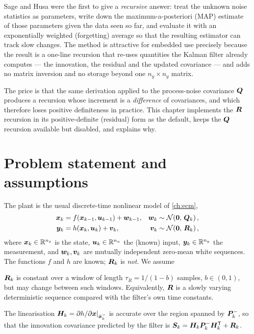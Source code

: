Sage and Husa \cite{sagehusa1969} were the first to give a \emph{recursive} answer: treat the
unknown noise statistics as parameters, write down the maximum-a-posteriori (MAP) estimate of those
parameters given the data seen so far, and evaluate it with an exponentially weighted (forgetting)
average so that the resulting estimator can track slow changes.  The method is attractive for
embedded use precisely because the result is a one-line recursion that re-uses quantities the
Kalman filter already computes --- the innovation, the residual and the updated covariance --- and
adds no matrix inversion and no storage beyond one $n_y\times n_y$ matrix.

The price is that the same derivation applied to the process-noise covariance $\bm{Q}$ produces a
recursion whose increment is a \emph{difference} of covariances, and which therefore loses positive
definiteness in practice.  This chapter implements the $\bm{R}$ recursion in its positive-definite
(residual) form as the default, keeps the $\bm{Q}$ recursion available but disabled, and explains why.

\section{Problem statement and assumptions}
The plant is the usual discrete-time nonlinear model of \cref{ch:ecm},
\begin{align}
\bm{x}_{k} &= f(\bm{x}_{k-1}, \bm{u}_{k-1}) + \bm{w}_{k-1}, & \bm{w}_k &\sim \mathcal{N}\!\left(\bm{0},\,\bm{Q}_k\right), \label{eq:sh:proc}\\
\bm{y}_{k} &= h(\bm{x}_{k}, \bm{u}_{k}) + \bm{v}_{k},       & \bm{v}_k &\sim \mathcal{N}\!\left(\bm{0},\,\bm{R}_k\right), \label{eq:sh:meas}
\end{align}
where $\bm{x}_k\in\mathbb{R}^{n_x}$ is the state, $\bm{u}_k\in\mathbb{R}^{n_u}$ the (known) input, $\bm{y}_k\in\mathbb{R}^{n_y}$
the measurement, and $\bm{w}_k, \bm{v}_k$ are mutually independent zero-mean white sequences.  The
functions $f$ and $h$ are known; $\bm{R}_k$ is \emph{not}.  We assume

\begin{assumption}\label{as:sh:slow}
$\bm{R}_k$ is constant over a window of length $\tau_R = 1/(1-b)$ samples, $b\in(0,1)$, but may change
between such windows.  Equivalently, $\bm{R}$ is a slowly varying deterministic sequence compared with
the filter's own time constants.
\end{assumption}
\begin{assumption}\label{as:sh:lin}
The linearisation $\bm{H}_k = \partial h/\partial\bm{x}|_{\hat{\bm{x}}^{-}_k}$ is accurate over the region spanned by
$\bm{P}^{-}_k$, so that the innovation covariance predicted by the filter is
$\bm{S}_k=\bm{H}_k\bm{P}^{-}_k\bm{H}_k^{\mathsf{T}}+\bm{R}_k$.
\end{assumption}

